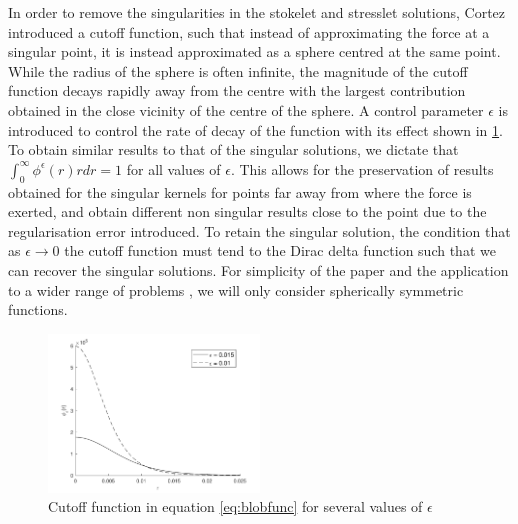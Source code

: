 In order to remove the singularities in the stokelet and stresslet solutions, Cortez \cite{Cortez2001} introduced a cutoff function, such that instead of approximating the force at a singular point, it is instead approximated as a sphere centred at the same point. While the radius of the sphere is often infinite, the magnitude of the cutoff function decays rapidly away from the centre with the largest contribution obtained in the close vicinity of the centre of the sphere. A  control parameter $\epsilon$ is introduced to control the rate of decay of the function with its effect shown in \cref{fig:blobfunc}. To obtain similar results to that of the singular solutions, we dictate that $\int_0^\infty \phi^\epsilon(r) r dr=1$ for all values of $\epsilon$. This allows for the preservation of results obtained for the singular kernels for points far away from where the force is exerted, and obtain different non singular results close to the point due to the regularisation error introduced. To retain the singular solution, the condition that as $\epsilon \to 0$ the cutoff function must tend to the Dirac delta function such that we can recover the singular solutions. For simplicity of the paper and the application to a wider range of problems \cite{Olson2013ModelingFormulation}, we will only consider spherically symmetric functions.

\begin{figure}
    \centering
    \includegraphics[width=0.5\textwidth]{Images/BlobFunc.pdf}
    \caption{Cutoff function in equation \cref{eq:blobfunc} for several values of $\epsilon$}
    \label{fig:blobfunc}
\end{figure}

